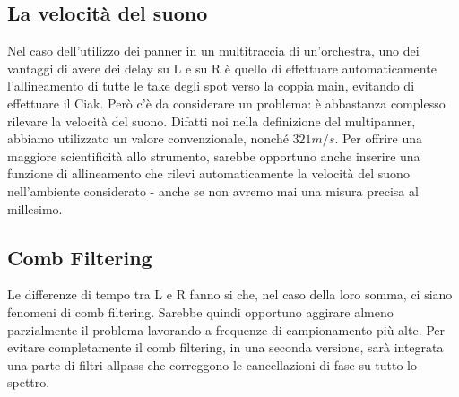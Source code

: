 \documentclass{article}
\begin{document}
\subsection{La velocità del suono}
    Nel caso dell'utilizzo dei panner in un multitraccia di un'orchestra, uno dei vantaggi di avere dei delay su L e su R è quello di effettuare automaticamente l'allineamento di tutte le take degli spot verso la coppia main, evitando di effettuare il Ciak. Però c'è da considerare un problema: è abbastanza complesso rilevare la velocità del suono. Difatti noi nella definizione del multipanner, abbiamo utilizzato un valore convenzionale, nonché $321 m/s$. Per offrire una maggiore scientificità allo strumento, sarebbe opportuno anche inserire una funzione di allineamento che rilevi automaticamente la velocità del suono nell'ambiente considerato - anche se non avremo mai una misura precisa al millesimo.
    
\subsection{Comb Filtering}
    Le differenze di tempo tra L e R fanno si che, nel caso della loro somma, ci siano fenomeni di comb filtering. Sarebbe quindi opportuno aggirare almeno parzialmente il problema lavorando a frequenze di campionamento più alte. Per evitare completamente il comb filtering, in una seconda versione, sarà integrata una parte di filtri allpass che correggono le cancellazioni di fase su tutto lo spettro.
\end{document}
